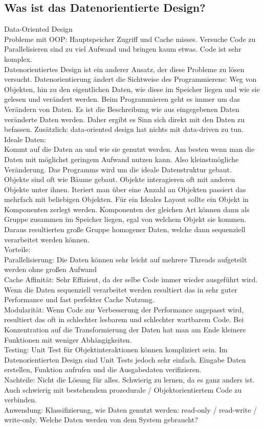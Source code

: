 \documentclass[12pt, titlepage]{article}
\DeclareRobustCommand{\#}{\adjustbox{valign=B,totalheight=.57\baselineskip}{\oldhash}}%
\begin{document}
\subsection{Was ist das Datenorientierte Design?}
Data-Oriented Design \cite{Data-OrientedDesign}\\
Probleme mit OOP: Hauptspeicher Zugriff und Cache misses. Versuche Code zu Parallelisieren sind zu viel Aufwand und bringen kaum etwas. Code ist sehr komplex.\\Datenorientiertes Design ist ein anderer Ansatz, der diese Probleme zu lösen versucht. Datenorientierung ändert die Sichtweise des Programmierens: Weg von Objekten, hin zu den eigentlichen Daten, wie diese im Speicher liegen und wie sie gelesen und verändert werden. Beim Programmieren geht es immer um das Verändern von Daten. Es ist die Beschreibung wie aus eingegebenen Daten veränderte Daten werden. Daher ergibt es Sinn sich direkt mit den Daten zu befassen. Zusätzlich: \glqq data-oriented design\grqq{}  hat nichts mit \glqq data-driven\grqq{} zu tun.\\ Ideale Daten:\\Kommt auf die Daten an und wie sie genutzt werden. Am besten wenn man die Daten mit möglichst geringem Aufwand nutzen kann. Also kleinstmögliche Veränderung. Das Programms wird um die ideale Datenstruktur gebaut.\\Objekte sind oft wie Bäume gebaut. Objekte interagieren oft mit anderen Objekte \glqq unter\grqq{} ihnen. Iteriert man über eine Anzahl an Objekten passiert das mehrfach mit beliebigen Objekten. Für ein Ideales Layout sollte ein Objekt in Komponenten zerlegt werden. Komponenten der gleichen Art können dann als Gruppe zusammen im Speicher liegen, egal von welchem Objekt sie kommen. Daraus resultierten große Gruppe homogener Daten, welche dann sequenziell verarbeitet werden können.\\Vorteile:\\Parallelisierung: Die Daten können sehr leicht auf mehrere Threads aufgeteilt werden ohne großen Aufwand\\Cache Affinität: Sehr Effizient, da der selbe Code immer wieder ausgeführt wird. Wenn die Daten sequenziell verarbeitet werden resultiert das in sehr guter Performance und fast perfekter Cache Nutzung.\\Modularität: Wenn Code zur Verbesserung der Performance angepasst wird, resultiert das oft in schlechter lesbarem und schlechter wartbarem Code. Bei Konzentration auf die Transformierung der Daten hat man am Ende kleinere Funktionen mit weniger Abhängigkeiten.\\Testing: Unit Test für Objektinteraktionen können kompliziert sein. Im Datenorientierten Design sind Unit Tests jedoch sehr einfach. Eingabe Daten erstellen, Funktion aufrufen und die Ausgabedaten verifizieren.\\Nachteile: Nicht die Lösung für alles. Schwierig zu lernen, da es ganz anders ist. Auch schwierig mit bestehendem prozedurale / Objektorientiertem Code zu verbinden.\\Anwendung: Klassifizierung, wie Daten genutzt werden: read-only / read-write / write-only. Welche Daten werden von dem System gebraucht? 
\end{document}
